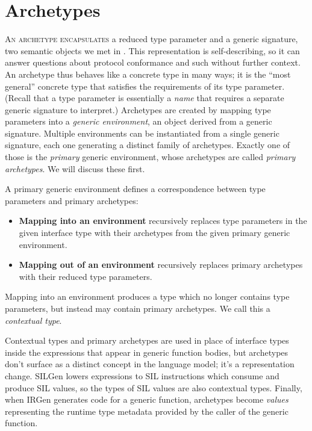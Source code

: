 \documentclass[../generics]{subfiles}
\begin{document}
\chapter{Archetypes}\label{genericenv}

\lettrine{A}{n archetype encapsulates} a reduced type parameter and a generic signature, two semantic objects we met in . This representation is self-describing, so it can answer questions about protocol conformance and such without further context. An archetype thus behaves like a concrete type in many ways; it is the ``most general'' concrete type that satisfies the requirements of its type parameter. (Recall that a type parameter is essentially a \emph{name} that requires a separate generic signature to interpret.) Archetypes are created by mapping type parameters into a \emph{generic environment}, an object derived from a generic signature. Multiple environments can be instantiated from a single generic signature, each one generating a distinct family of archetypes. Exactly one of those is the \emph{primary} generic environment, whose archetypes are called \emph{primary archetypes}. We will discuss these first.

A primary generic environment defines a correspondence between type parameters and primary archetypes:
\begin{itemize}
\item {}\textbf{Mapping into an environment} recursively replaces type parameters in the given interface type with their archetypes from the given primary generic environment.
\item {}\textbf{Mapping out of an environment} recursively replaces primary archetypes with their reduced type parameters.
\end{itemize}
Mapping into an environment produces a type which no longer contains type parameters, but instead may contain primary archetypes. We call this a \emph{contextual type}.

Contextual types and primary archetypes are used in place of interface types inside the expressions that appear in generic function bodies, but archetypes don't surface as a distinct concept in the language model; it's a representation change. SILGen lowers expressions to SIL instructions which consume and produce SIL values, so the types of SIL values are also contextual types. Finally, when IRGen generates code for a generic function, archetypes become \emph{values} representing the runtime type metadata provided by the caller of the generic function.
\end{document}
